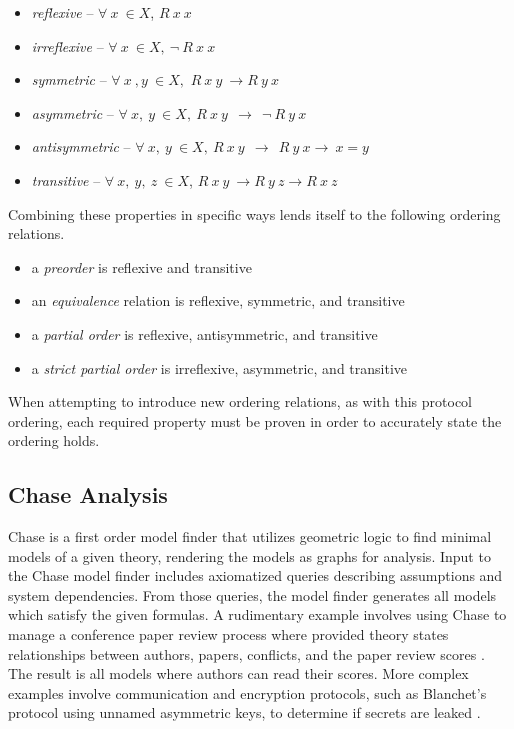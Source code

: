 \documentclass[runningheads]{llncs}
\theoremstyle{definition}
\newcommand{\squash}{\itemsep=0pt\parskip=0pt}
\begin{document}
\begin{itemize}
    \squash
    \item \emph{reflexive} -- $ \forall\: x\: \in X$, $R\: x\: x$
    \item \emph{irreflexive} -- $ \forall \: x\: \in X, \: \neg \: R\: x\: x$
    \item \emph{symmetric} -- $ \forall\: x\: , y\: \in X,$ $R\: x\: y\:\rightarrow R\: y\: x$
    \item \emph{asymmetric} --  $\forall\: x,\: y\:\in X,\: R\: x\: y\:\: \rightarrow  \:\: \neg \:R\: y\: x $  
    \item \emph{antisymmetric} --  $\forall\: x,\: y\:\in X,\: R\: x\: y\:\: \rightarrow \:\: R\: y\: x \rightarrow \:x = y$ 
    \item \emph{transitive} -- $ \forall\: x,\: y,\: z\:\in X$, $R\: x\: y\: \rightarrow R\: y\: z \rightarrow R\: x\: z$
\end{itemize}

\noindent Combining these properties in specific ways lends itself to the following ordering relations.

\begin{itemize}
    \squash
    \item a \emph{preorder} is reflexive and transitive
    \item an \emph{equivalence} relation is reflexive, symmetric, and transitive 
    \item a \emph{partial order} is reflexive, antisymmetric, and transitive 
    \item a \emph{strict partial order} is irreflexive, asymmetric, and transitive 
\end{itemize}

\noindent When attempting to introduce new ordering relations, as with this protocol ordering, each required property must be proven in order to accurately state the ordering holds.  

\subsection*{Chase Analysis}

Chase \cite{Ramsdell:2020:Chase,Rowe:2021:AutomatedTrust} is a first order model finder that utilizes geometric logic\cite{Enderton:logic} to find minimal models of a given theory, rendering the models as graphs for analysis. Input to the Chase model finder includes axiomatized queries describing assumptions and system dependencies. From those queries, the model finder generates all models which satisfy the given formulas. A rudimentary example involves using Chase to manage a conference paper review process where provided theory states relationships between authors, papers, conflicts, and the paper review scores \cite{Ramsdell:2020:Chase:Guide}. The result is all models where authors can read their scores. More complex examples involve communication and encryption protocols, such as Blanchet's protocol using unnamed asymmetric keys, to determine if secrets are leaked \cite{Ramsdell:2020:Chase:Guide}. 
\end{document}
